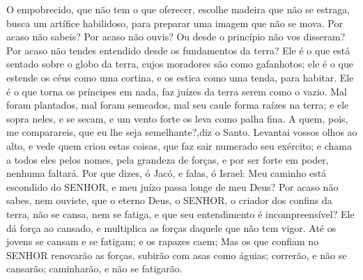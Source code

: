 {  O empobrecido, que não tem o que oferecer, escolhe madeira que não se estraga,
{} busca um artífice habilidoso, para preparar uma imagem que não se mova.
  Por acaso não sabeis? Por acaso não ouvis? Ou desde o princípio não vos disseram? Por acaso não tendes entendido desde os fundamentos da terra?
  Ele é o que está sentado sobre o globo da terra, cujos moradores são
{} como gafanhotos; ele é o que estende os céus como uma cortina, e os estica como uma tenda, para
{} habitar.
  Ele é o que torna os príncipes em nada,
{} faz juízes da terra serem como o vazio.
  Mal foram plantados, mal foram semeados, mal seu caule forma raízes na terra; e
{} ele sopra neles, e se secam, e um vento forte os leva como palha fina.
  A quem, pois, me comparareis, que eu lhe seja semelhante?,diz o Santo.
  Levantai vossos olhos ao alto, e vede quem criou estas coisas, que faz sair numerado seu exército; e chama a todos eles pelos nomes, pela grandeza de
{} forças, e por ser forte em poder, nenhuma
{} faltará.
  Por que dizes, ó Jacó, e falas, ó Israel: Meu caminho está escondido do SENHOR, e meu juízo passa longe de meu Deus?
  Por acaso não sabes, nem ouviste, que o eterno Deus, o SENHOR, o criador dos confins da terra, não se cansa, nem se fatiga, e que seu entendimento é incompreensível?
  Ele dá força ao cansado, e multiplica as forças daquele que não tem vigor.
  Até os jovens se cansam e se fatigam; e os rapazes caem;
  Mas os que confiam no SENHOR renovarão as forças, subirão com asas como águias; correrão, e não se cansarão; caminharão, e não se fatigarão.
\par }

